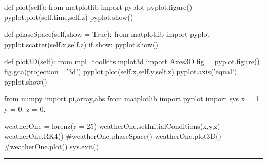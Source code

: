 \begin{codeexample}
\begin{VerbatimOut}{\listingFile}
    def plot(self):
        from matplotlib import pyplot
        pyplot.figure()
        pyplot.plot(self.time,self.z)
        pyplot.show()

    def phaseSpace(self,show = True):
        from matplotlib import pyplot
        pyplot.scatter(self.x,self.z)
        if show:
            pyplot.show()

    def plot3D(self):
        from mpl_toolkits.mplot3d import Axes3D
        fig = pyplot.figure()
        fig.gca(projection= '3d')
        pyplot.plot(self.x,self.y,self.z)
        pyplot.axis('equal')
        pyplot.show()

from numpy import pi,array,abs
from matplotlib import pyplot
import sys
x = 1.
y = 0.
z = 0.

weatherOne = lorenz(r = 25)
weatherOne.setInitialConditions(x,y,z)
weatherOne.RK4()
#weatherOne.phaseSpace()
weatherOne.plot3D()
#weatherOne.plot()
sys.exit()
\end{VerbatimOut}
\end{codeexample}
\else
\noindent\rule{4 in}{0.01 in}
\fi
